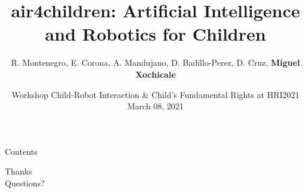 \documentclass[xcolor={dvipsnames},aspectratio=169,10pt]{beamer}
\title{air4children: Artificial Intelligence and Robotics for Children}
\author{
R. Montenegro,
E. Corona,
A. Mandujano,
D. Badillo-Perez,
D. Cruz,
{\bf Miguel Xochicale}
}
\date{
Workshop Child-Robot Interaction \& Child's Fundamental Rights at \faHashtag HRI2021\\
March 08, 2021
}
\institute{
    \faTwitter @air4children  \faGithubAlt @air4children
	\faEnvelope air4children@gmail.com
		}
\begin{document}
\maketitle

\begin{frame}{Contents}
    \tableofcontents
\end{frame}






\begin{frame}[standout]
  Thanks \\
  Questions?
\end{frame}
\end{document}

